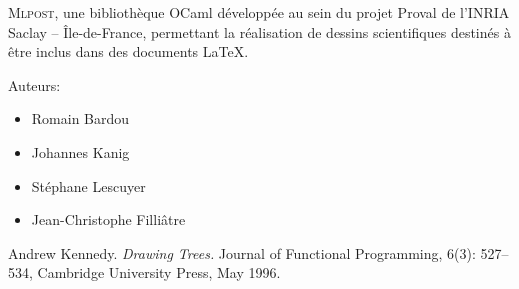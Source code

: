 \documentclass[a4paper,12pt]{article}
\newcommand{\mlpost}{\textsc{Mlpost}}
\begin{document}
\begin{thebibliography}{99}
 \mlpost, une bibliothèque OCaml développée au sein du projet Proval de l’INRIA Saclay – Île-de-France, permettant la réalisation de dessins scientifiques destinés à être inclus dans des documents \LaTeX.

Auteurs:
\begin{itemize}
    \item Romain Bardou
    \item Johannes Kanig
    \item Stéphane Lescuyer
    \item Jean-Christophe Filliâtre 
\end{itemize}

Andrew Kennedy. 
\emph{Drawing Trees.}
Journal of Functional Programming, 
6(3): 527--534, Cambridge University Press, May 1996.
\end{thebibliography}
\end{document}
